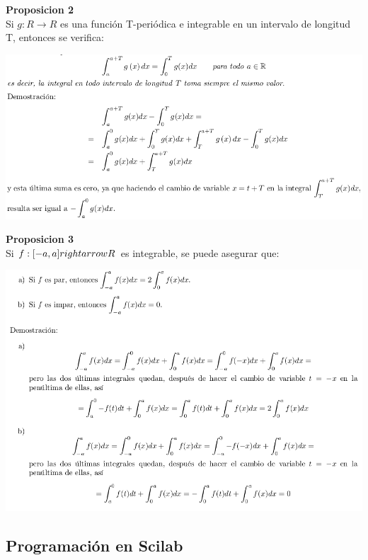 \documentclass[10pt,a4paper]{book}
\begin{document}
\textbf{Proposicion 2}\\
Si  $g  : R \rightarrow R$  es una función T-periódica e integrable en un intervalo de longitud T,    entonces se verifica:\\

\begin{center}
	\includegraphics[scale=0.45]{AudioFourier4.png}
\end{center}

\textbf{Proposicion 3}\\
Si $f:[-a,a] \\rightarrow R  $ es integrable, se puede asegurar que: \\

\begin{center}
	\includegraphics[scale=0.45]{AudioFourier5.png}
\end{center}

\subsection{Programación en Scilab}
\end{document}
